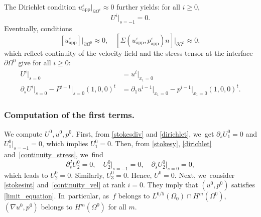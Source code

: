 \documentclass[JEP,XML,SOM,Unicode,NoEqCountersInSection,published]{cedram}
\newcommand{\app}{\mathrm{app}}
\theoremstyle{plain}
\theoremstyle{definition}
\let\pa\partial
\let\na\nabla
\let\eps\varepsilon
\begin{document}
The Dirichlet condition $u^\eps_{\app}\vert_{\pa \Omega^\eps} \approx 0$ further yields: for all $i \ge 0$,
\begin{equation} \label{dirichlet}
U^i\vert_{s = -1} = 0.
\end{equation}
Eventually, conditions
\[
[u^\eps_{\app}]\vert_{\pa \Omega^0} \approx 0, \quad [\Sigma(u^\eps_{\app},p^\eps_{\app})n]\vert_{\pa \Omega^0} \approx 0,
\]
which reflect continuity of the velocity field and the stress tensor at the interface $\pa \Omega^0$ give for all $i \ge 0$:
\begin{align}
U^i\vert_{s=0} & = u^i\vert_{x_1=0} \label{continuity_vel} \\
\pa_s U^i \vert_{s=0} - P^{i-1}\vert_{s=0} (1,0,0)^t & = \pa_1 u^{i-1}\vert_{x_1=0} - p^{i-1}\vert_{x_1=0} (1,0,0)^t. \label{continuity_stress}
\end{align}

\subsubsection*{Computation of the first terms.} We compute $U^0, u^0,p^0$. First, from \eqref{stokesdiv} and \eqref{dirichlet}, we~get $\pa_s U^0_1 = 0$ and $U^0_1\vert_{s=-1} = 0$, which implies $U^0_1 = 0$. Then, from \eqref{stokesy}, \eqref{dirichlet} and~\eqref{continuity_stress}, we~find
\[
\pa^2_s U^0_2 = 0, \quad U^0_2\vert_{s=-1} = 0, \quad \pa_s U^0_2\vert_{s=0} = 0,
\]
which leads to $U^0_2 = 0$. Similarly, $U^0_3 = 0$. Hence, $U^0 = 0$. Next, we~consider \eqref{stokesint} and~\eqref{continuity_vel} at rank $i=0$. They imply that $(u^0,p^0)$ satisfies \eqref{limit_equation}. In~particular, as~$f$ belongs to $L^{6/5}(\Omega_0) \cap H^m(\Omega^0)$, $(\na u^0,p^0)$ belongs to $H^m(\Omega^0)$ for all $m$.
\end{document}
